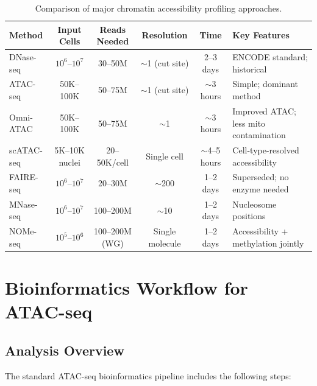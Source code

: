 \begin{table}[htbp]
\centering
\caption[Comparison of chromatin accessibility profiling methods.]{Comparison of major chromatin accessibility profiling approaches.}
\label{tab:chromatin:comparison}
\small
\begin{tabularx}{\textwidth}{l c c c c X}
\toprule
\textbf{Method} & \textbf{Input Cells} & \textbf{Reads Needed} & \textbf{Resolution} & \textbf{Time} & \textbf{Key Features} \\
\midrule
DNase-seq & $10^{6}$--$10^{7}$ & 30--50M & $\sim$1\basepair{} (cut site) & 2--3 days & ENCODE standard; historical \\
\addlinespace
ATAC-seq & 50K--100K & 50--75M & $\sim$1\basepair{} (cut site) & $\sim$3 hours & Simple; dominant method \\
\addlinespace
Omni-ATAC & 50K--100K & 50--75M & $\sim$1\basepair{} & $\sim$3 hours & Improved ATAC; less mito contamination \\
\addlinespace
scATAC-seq & 5K--10K nuclei & 20--50K/cell & Single cell & $\sim$4--5 hours & Cell-type-resolved accessibility \\
\addlinespace
FAIRE-seq & $10^{6}$--$10^{7}$ & 20--30M & $\sim$200\basepair{} & 1--2 days & Superseded; no enzyme needed \\
\addlinespace
MNase-seq & $10^{6}$--$10^{7}$ & 100--200M & $\sim$10\basepair{} & 1--2 days & Nucleosome positions \\
\addlinespace
NOMe-seq & $10^{5}$--$10^{6}$ & 100--200M (WG) & Single molecule & 1--2 days & Accessibility + methylation jointly \\
\bottomrule
\end{tabularx}
\end{table}

\section{Bioinformatics Workflow for ATAC-seq}
\label{sec:chromatin:bioinformatics}

\subsection{Analysis Overview}
\label{subsec:chromatin:analysis-overview}

The standard ATAC-seq bioinformatics pipeline includes the following steps:

